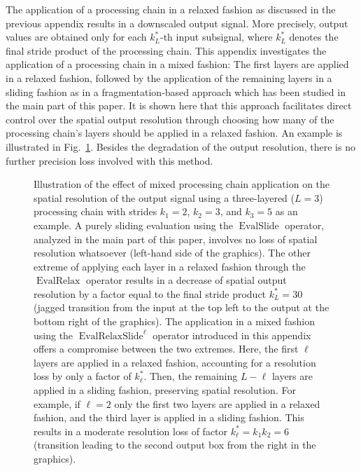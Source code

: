 \documentclass[journal]{IEEEtran}
\DeclareMathOperator{\EvalSlide}{EvalSlide}
\DeclareMathOperator{\EvalRelax}{EvalRelax}
\DeclareMathOperator{\EvalRelaxSlide}{EvalRelaxSlide}
\begin{document}
\clearpage
{}
The application of a processing chain in a relaxed fashion as discussed in the previous appendix results in a downscaled output signal.
More precisely, output values are obtained only for each $k_L^*$-th input subsignal, where $k_L^*$ denotes the final stride product of the processing chain.
This appendix investigates the application of a processing chain in a mixed fashion:
The first layers are applied in a relaxed fashion, followed by the application of the remaining layers in a sliding fashion as in a fragmentation-based approach which has been studied in the main part of this paper.
It is shown here that this approach facilitates direct control over the spatial output resolution through choosing how many of the processing chain's layers should be applied in a relaxed fashion.
An example is illustrated in Fig.~\ref{fig:relaxslide-dec}.
Besides the degradation of the output resolution, there is no further precision loss involved with this method.

\begin{figure}[t]
  \centering
  \caption{Illustration of the effect of mixed processing chain application on the spatial resolution of the output signal using a three-layered ($L = 3$) processing chain with strides $k_1 = 2$, $k_2 = 3$, and $k_3 = 5$ as an example.
    A purely sliding evaluation using the $\EvalSlide$ operator, analyzed in the main part of this paper, involves no loss of spatial resolution whatsoever (left-hand side of the graphics).
    The other extreme of applying each layer in a relaxed fashion through the $\EvalRelax$ operator results in a decrease of spatial output resolution by a factor equal to the final stride product $k_L^* = 30$ (jagged transition from the input at the top left to the output at the bottom right of the graphics).
    The application in a mixed fashion using the $\EvalRelaxSlide^\ell$ operator introduced in this appendix offers a compromise between the two extremes.
    Here, the first $\ell$ layers are applied in a relaxed fashion, accounting for a resolution loss by only a factor of $k_\ell^*$.
    Then, the remaining $L - \ell$ layers are applied in a sliding fashion, preserving spatial resolution.
    For example, if $\ell = 2$ only the first two layers are applied in a relaxed fashion, and the third layer is applied in a sliding fashion.
    This results in a moderate resolution loss of factor $k_\ell^* = k_1 k_2 = 6$ (transition leading to the second output box from the right in the graphics).}    
  \label{fig:relaxslide-dec}
\end{figure}
\end{document}
